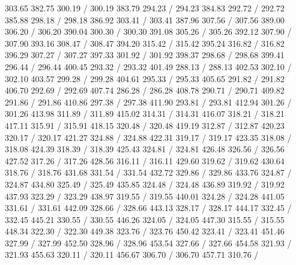 { 303.65 382.75 300.19 /
 300.19 383.79 294.23 /
 294.23 384.83 292.72 /
 292.72 385.88 298.18 /
 298.18 386.92 303.41 /
 303.41 387.96 307.56 /
 307.56 389.00 306.20 /
 306.20 390.04 300.30 /
 300.30 391.08 305.26 /
 305.26 392.12 307.90 /
 307.90 393.16 308.47 /
 308.47 394.20 315.42 /
 315.42 395.24 316.82 /
 316.82 396.29 307.27 /
 307.27 397.33 301.92 /
 301.92 398.37 298.68 /
 298.68 399.41 296.44 /
 296.44 400.45 293.32 /
 293.32 401.49 288.13 /
 288.13 402.53 302.10 /
 302.10 403.57 299.28 /
 299.28 404.61 295.33 /
 295.33 405.65 291.82 /
 291.82 406.70 292.69 /
 292.69 407.74 286.28 /
 286.28 408.78 290.71 /
 290.71 409.82 291.86 /
 291.86 410.86 297.38 /
 297.38 411.90 293.81 /
 293.81 412.94 301.26 /
 301.26 413.98 311.89 /
 311.89 415.02 314.31 /
 314.31 416.07 318.21 /
 318.21 417.11 315.91 /
 315.91 418.15 320.48 /
 320.48 419.19 312.87 /
 312.87 420.23 320.17 /
 320.17 421.27 324.88 /
 324.88 422.31 319.17 /
 319.17 423.35 318.08 /
 318.08 424.39 318.39 /
 318.39 425.43 324.81 /
 324.81 426.48 326.56 /
 326.56 427.52 317.26 /
 317.26 428.56 316.11 /
 316.11 429.60 319.62 /
 319.62 430.64 318.76 /
 318.76 431.68 331.54 /
 331.54 432.72 329.86 /
 329.86 433.76 324.87 /
 324.87 434.80 325.49 /
 325.49 435.85 324.48 /
 324.48 436.89 319.92 /
 319.92 437.93 323.29 /
 323.29 438.97 319.55 /
 319.55 440.01 324.28 /
 324.28 441.05 331.61 /
 331.61 442.09 328.66 /
 328.66 443.13 328.17 /
 328.17 444.17 332.45 /
 332.45 445.21 330.55 /
 330.55 446.26 324.05 /
 324.05 447.30 315.55 /
 315.55 448.34 322.30 /
 322.30 449.38 323.76 /
 323.76 450.42 323.41 /
 323.41 451.46 327.99 /
 327.99 452.50 328.96 /
 328.96 453.54 327.66 /
 327.66 454.58 321.93 /
 321.93 455.63 320.11 /
 320.11 456.67 306.70 /
 306.70 457.71 310.76 /
}
